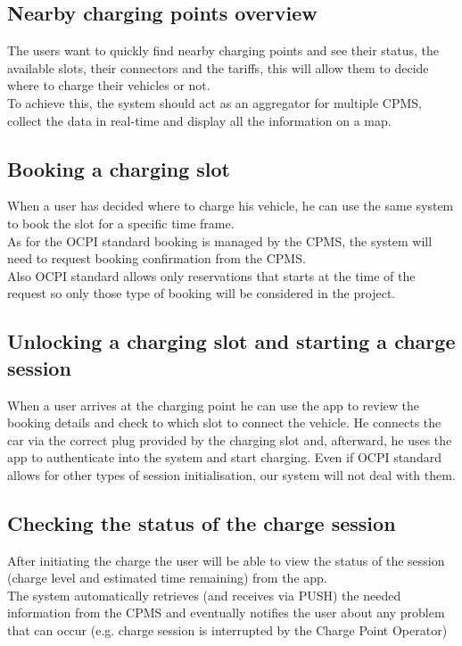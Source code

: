 \subsection{Nearby charging points overview}
The users want to quickly find nearby charging points and see their status, the available slots, their connectors and the tariffs, this will allow them to decide where to charge their vehicles or not.\\
To achieve this, the system should act as an aggregator for multiple CPMS, collect the data in real-time and display all the information on a map.

\subsection{Booking a charging slot}
When a user has decided where to charge his vehicle, he can use the same system to book the slot for a specific time frame.\\
As for the OCPI standard booking is managed by the CPMS, the system will need to request booking confirmation from the CPMS.\\
Also OCPI standard allows only reservations that starts at the time of the request so only those type of booking will be considered in the project.

\subsection{Unlocking a charging slot and starting a charge session}
When a user arrives at the charging point he can use the app to review the booking details and check to which slot to connect the vehicle. He connects the car via the correct plug provided by the charging slot and, afterward, he uses the app to authenticate into the system and start charging. Even if OCPI standard allows for other types of session initialisation, our system will not deal with them.

\subsection{Checking the status of the charge session}
After initiating the charge the user will be able to view the status of the session (charge level and estimated time remaining) from the app.\\
The system automatically retrieves (and receives via PUSH) the needed information from the CPMS and eventually notifies the user about any problem that can occur (e.g. charge session is interrupted by the Charge Point Operator)

